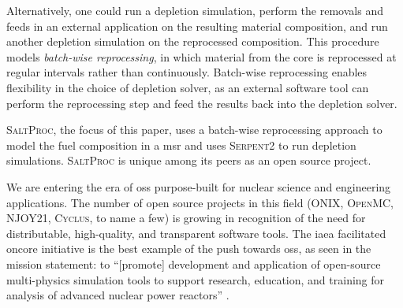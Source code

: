 \documentclass[letterpaper]{mc2023}
\newcommand{\Cyclus}{\textsc{Cyclus}\xspace}
\newcommand{\SaltProc}{\textsc{SaltProc}\xspace}
\newcommand{\OpenMC}{\textsc{OpenMC}\xspace}
\newcommand{\SerpentTWO}{\textsc{Serpent2}\xspace}
\newcommand{\ONIX}{\textsc{ONIX}\xspace}
\newcommand{\NJOYTWOONE}{\textsc{NJOY21}\xspace}
\begin{document}
Alternatively, one could run a depletion simulation, perform the removals and
feeds in an external application on the resulting material composition, and run
another depletion simulation on the reprocessed composition. This procedure
models {\it batch-wise reprocessing}, in which material from the core is
reprocessed at regular intervals rather than continuously. Batch-wise
reprocessing enables flexibility in the choice of depletion solver, as an
external software tool can perform the reprocessing step and feed the results
back into the depletion solver.

\SaltProc\cite{rykhlevskii_saltproc_2018}, the focus of this paper, uses a
batch-wise reprocessing approach to model the fuel composition in a \Gls{msr}
and uses \SerpentTWO\cite{leppanen_serpent_2014} to run depletion simulations.
\SaltProc is unique among its peers as an open source project.

    

We are entering the era of \gls{oss} purpose-built for nuclear
science and engineering applications. The number of open source projects in this
field
(\ONIX\cite{de_troullioud_de_lanversin_onix_2021}, \OpenMC,
\NJOYTWOONE\cite{noauthor_njoy21_2022}, \Cyclus\cite{noauthor_cyclus_2022}, to
name a few) is growing in recognition of the need for distributable,
high-quality, and transparent software tools. The \Gls{iaea} facilitated
\Gls{oncore} initiative \cite{fiorina_initiative_2021} is the best
example of the push towards \Gls{oss}, as seen in the mission statement: to
``[promote] development and application of open-source multi-physics simulation
tools to support research, education, and training for analysis of advanced
nuclear power reactors'' \cite{iaea_open-source_2022}. 
\end{document}
